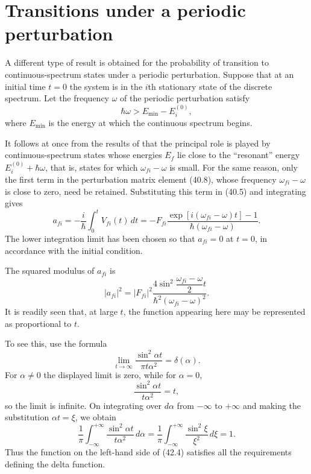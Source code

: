 \section{Transitions under a periodic perturbation}

A different type of result is obtained for the probability of transition to
continuous-spectrum states under a periodic perturbation. Suppose that at an
initial time $t=0$ the system is in the $i$th stationary state of the discrete
spectrum. Let the frequency $\omega$ of the periodic perturbation satisfy
\begin{equation}
  \hbar\omega>E_{\min}-E_i^{(0)},
  \tag{42.1}
\end{equation}
where $E_{\min}$ is the energy at which the continuous spectrum begins.

It follows at once from the results of  that the principal role is played
by continuous-spectrum states whose energies $E_f$ lie close to the
``resonant'' energy $E_i^{(0)}+\hbar\omega$, that is, states for which
$\omega_{fi}-\omega$ is small. For the same reason, only the first term in the
perturbation matrix element (40.8), whose frequency
$\omega_{fi}-\omega$ is close to zero, need be retained. Substituting this
term in (40.5) and integrating gives
\begin{equation}
  a_{fi}=-\frac{i}{\hbar}\int_0^t V_{fi}(t)\,dt
  =-F_{fi}\frac{\exp[i(\omega_{fi}-\omega)t]-1}
                  {\hbar(\omega_{fi}-\omega)}.
  \tag{42.2}
\end{equation}
The lower integration limit has been chosen so that $a_{fi}=0$ at $t=0$, in
accordance with the initial condition.

The squared modulus of $a_{fi}$ is
\begin{equation}
  |a_{fi}|^2=|F_{fi}|^2
  \frac{4\sin^2\dfrac{\omega_{fi}-\omega}{2}t}
       {\hbar^2(\omega_{fi}-\omega)^2}.
  \tag{42.3}
\end{equation}
It is readily seen that, at large $t$, the function appearing here may be
represented as proportional to $t$.

To see this, use the formula
\begin{equation}
  \lim_{t\to\infty}\frac{\sin^2\alpha t}{\pi t\alpha^2}=\delta(\alpha).
  \tag{42.4}
\end{equation}
For $\alpha\ne0$ the displayed limit is zero, while for $\alpha=0$,
\[
  \frac{\sin^2\alpha t}{t\alpha^2}=t,
\]
so the limit is infinite. On integrating over $d\alpha$ from $-\infty$ to
$+\infty$ and making the substitution $\alpha t=\xi$, we obtain
\[
  \frac1\pi\int_{-\infty}^{+\infty}
  \frac{\sin^2\alpha t}{t\alpha^2}\,d\alpha
  =\frac1\pi\int_{-\infty}^{+\infty}
  \frac{\sin^2\xi}{\xi^2}\,d\xi=1.
\]
Thus the function on the left-hand side of (42.4) satisfies all the
requirements defining the delta function.

